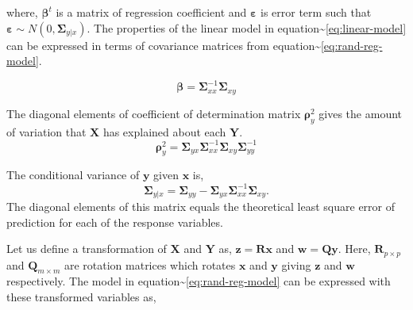 \documentclass[12pt,A4paper,authoryear]{elsarticle} %
\providecommand{\tightlist}{%
  \setlength{\itemsep}{0pt}\setlength{\parskip}{0pt}}
\theoremstyle{definition}
\theoremstyle{definition}
\theoremstyle{remark}
\begin{document}
where, \(\boldsymbol{\beta}^t\) is a matrix of regression coefficient
and \(\boldsymbol{\varepsilon}\) is error term such that
\(\boldsymbol{\varepsilon} \sim N\left(0, \boldsymbol{\Sigma}_{y|x}\right)\).
The properties of the linear model in
equation\textasciitilde{}\eqref{eq:linear-model} can be expressed in terms
of covariance matrices from
equation\textasciitilde{}\eqref{eq:rand-reg-model}.

\begin{description}
\tightlist
\item[Regression Coefficients]
\[ \boldsymbol{\beta} = \boldsymbol{\Sigma}_{xx}^{-1}\boldsymbol{\Sigma}_{xy}\]
\item[Coefficient of Determination \(\boldsymbol{\rho}_y^2\)]
The diagonal elements of coefficient of determination matrix
\(\boldsymbol{\rho}_y^2\) gives the amount of variation that
\(\mathbf{X}\) has explained about each \(\mathbf{Y}\).
\[\boldsymbol{\rho}_y^2 = \boldsymbol{\Sigma}_{yx}\boldsymbol{\Sigma}_{xx}^{-1}\boldsymbol{\Sigma}_{xy}\boldsymbol{\Sigma}_{yy}^{-1}\]
\item[Conditional variance]
The conditional variance of \(\mathbf{y}\) given \(\mathbf{x}\) is,
\[\boldsymbol{\Sigma}_{y|x} = \boldsymbol{\Sigma}_{yy} - \boldsymbol{\Sigma}_{yx}\boldsymbol{\Sigma}_{xx}^{-1}\boldsymbol{\Sigma}_{xy}.\]
The diagonal elements of this matrix equals the theoretical least square
error of prediction for each of the response variables.
\end{description}

Let us define a transformation of \(\mathbf{X}\) and \(\mathbf{Y}\) as,
\(\mathbf{z} = \mathbf{Rx}\) and \(\mathbf{w} = \mathbf{Qy}\). Here,
\(\mathbf{R}_{p\times p}\) and \(\mathbf{Q}_{m\times m}\) are rotation
matrices which rotates \(\mathbf{x}\) and \(\mathbf{y}\) giving
\(\mathbf{z}\) and \(\mathbf{w}\) respectively. The model in
equation\textasciitilde{}\eqref{eq:rand-reg-model} can be expressed with
these transformed variables as,
\end{document}
